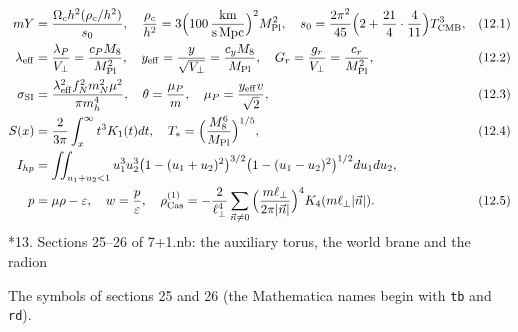 \documentclass[10pt,a4paper]{article}
\makeatletter
\renewcommand\section{\@startsection{section}{1}{\z@}{-3.5ex \@plus -1ex \@minus -.2ex}{2.3ex \@plus.2ex}{\normalfont\Large\bfseries\raggedright}}
\makeatother
\begin{document}
\begin{align*}
mY&=\frac{\Omega_ch^2(\rho_c/h^2)}{s_0},\quad \frac{\rho_c}{h^2}=3\Big(100\,\frac{\rm km}{\rm s\,Mpc}\Big)^2M_{\rm Pl}^2,\quad s_0=\frac{2\pi^2}{45}\Big(2+\frac{21}4\cdot\frac4{11}\Big)T_{\rm CMB}^3,&&(12.1) \\
\lambda_{\rm eff}&=\frac{\lambda_P}{V_\perp}=\frac{c_PM_8}{M_{\rm Pl}^2},\quad y_{\rm eff}=\frac{y}{\sqrt{V_\perp}}=\frac{c_yM_8}{M_{\rm Pl}},\quad G_r=\frac{g_r}{V_\perp}=\frac{c_r}{M_{\rm Pl}^2},&&(12.2) \\
\sigma_{\rm SI}&=\frac{\lambda_{\rm eff}^2f_N^2m_N^2\mu^2}{\pi m_h^4},\quad \theta=\frac{\mu_P}m,\quad \mu_P=\frac{y_{\rm eff}v}{\sqrt2},&&(12.3) \\
S(x)&=\frac2{3\pi}\int_x^\infty t^3K_1(t)dt,\quad T_*=\Big(\frac{M_8^6}{M_{\rm Pl}}\Big)^{1/5},&&(12.4) \\
I_{hp}&=\iint_{u_1+u_2<1}u_1^3u_2^3\big(1-(u_1+u_2)^2\big)^{3/2}\big(1-(u_1-u_2)^2\big)^{1/2}du_1du_2, \\
p&=\mu\rho-\varepsilon,\quad w=\frac p\varepsilon,\quad \rho_{\rm Cas}^{(1)}=-\frac2{\ell_\perp^4}\sum_{\vec n\ne0}\Big(\frac{m\ell_\perp}{2\pi|\vec n|}\Big)^4K_4(m\ell_\perp|\vec n|).&&(12.5)
\end{align*}
\section*{13. Sections 25–26 of 7+1.nb: the auxiliary torus, the world brane and the radion}
The symbols of sections 25 and 26 (the Mathematica names begin with \texttt{tb} and \texttt{rd}).
\end{document}
